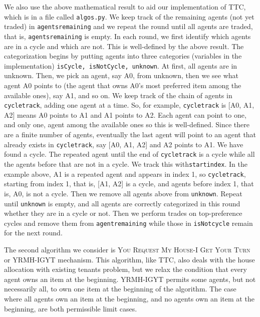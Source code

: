 \documentclass[12pt]{article}
\begin{document}
We also use the above mathematical result to aid our implementation of TTC, which is in a file called \texttt{algos.py}. We keep track of the remaining agents (not yet traded) in \texttt{agents\textunderscore remaining} and we repeat the round until all agents are traded, that is, \texttt{agents\textunderscore remaining} is empty. In each round, we first identify which agents are in a cycle and which are not. This is well-defined by the above result. The categorization begins by putting agents into three categories (variables in the implementation) \texttt{isCycle, isNotCycle, unknown}. At first, all agents are in unknown. Then, we pick an agent, say A0, from unknown, then we see what agent A0 points to (the agent that owns A0's most preferred item among the available ones), say A1, and so on. We keep track of the chain of agents in \texttt{cycle\textunderscore track}, adding one agent at a time. So, for example, \texttt{cycle\textunderscore track} is [A0, A1, A2] means A0 points to A1 and A1 points to A2. Each agent can point to one, and only one, agent among the available ones so this is well-defined. Since there are a finite number of agents, eventually the last agent will point to an agent that already exists in \texttt{cycle\textunderscore track}, say [A0, A1, A2] and A2 points to A1. We have found a cycle. The repeated agent until the end of \texttt{cycle\textunderscore track} is a cycle while all the agents before that are not in a cycle. We track this with\texttt{start\textunderscore index}. In the example above, A1 is  a repeated agent and appears in index 1, so \texttt{cycle\textunderscore track}, starting from index 1, that is, [A1, A2] is a cycle, and agents before index 1, that is, A0, is not a cycle. Then we remove all agents above from \texttt{unknown}. Repeat until \texttt{unknown} is empty, and all agents are correctly categorized in this round whether they are in a cycle or not. Then we perform trades on top-preference cycles and remove them from \texttt{agent\textunderscore remaining} while those in \texttt{isNotcycle} remain for the next round.
 
The second algorithm we consider is \textsc{You Request My House-I Get Your Turn} or \textsc{YRMH-IGYT} mechanism. This algorithm, like TTC, also deals with the house allocation with existing tenants problem, but we relax the condition that every agent owns an item at the beginning. YRMH-IGYT permits some agents, but not necessarily all, to own one item at the beginning of the algorithm. The case where all agents own an item at the beginning, and no agents own an item at the beginning, are both permissible limit cases.
 
\end{document}
